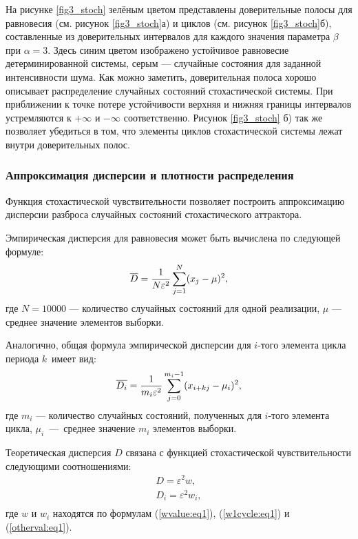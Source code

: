 \documentclass[a4paper, 14pt]{extreport}
\numberwithin{equation}{section}
\numberwithin{figure}{section}
\numberwithin{table}{section}
\begin{document}
				На рисунке \ref{fig3_stoch} зелёным цветом представлены доверительные полосы для равновесия (см. рисунок \ref{fig3_stoch}а) и циклов (см. рисунок \ref{fig3_stoch}б), составленные из доверительных интервалов для каждого значения параметра $ \beta $ при $ \alpha = 3 $. Здесь синим цветом изображено устойчивое равновесие детерминированной системы, серым --- случайные состояния для заданной интенсивности шума. Как можно заметить, доверительная полоса хорошо описывает распределение случайных состояний стохастической системы. При приближении к точке потере устойчивости верхняя и нижняя границы интервалов устремляются к $ +\infty $ и $ -\infty $ соответственно. Рисунок \ref{fig3_stoch} б) так же позволяет убедиться в том, что элементы циклов стохастической системы лежат внутри доверительных полос.

			\subsubsection{Аппроксимация дисперсии и плотности распределения}
            \label{approx_disp_density}
				Функция стохастической чувствительности позволяет построить аппроксимацию дисперсии разброса случайных состояний стохастического аттрактора. %

                Эмпирическая дисперсия для равновесия может быть вычислена по следующей формуле:
				\begin{equation}
					\overline{D} = \frac{1}{N \varepsilon^{2}} \sum\limits_{j=1}^N (x_{j} - \mu)^2, \\[1mm]
				\end{equation}
				где $ N = 10000 $ --- количество случайных состояний для одной реализации, $ \mu $ --- среднее значение элементов выборки. %

                Аналогично, общая формула эмпирической дисперсии для $i$-того элемента цикла периода $ k $~имеет вид:
				\begin{equation}
					\overline{D_{i}} = \frac{1}{m_{i} \varepsilon^{2}} \sum\limits_{j=0}^{m_{i}-1} (x_{i+kj} - \mu_{i})^2, \\[1mm]
				\end{equation}
				где $ m_{i} $ --- количество случайных состояний, полученных для $i$-того элемента цикла, $ \mu_{i} $~---~среднее значение $ m_{i} $ элементов выборки. %

                Теоретическая дисперсия $ D $ связана с функцией стохастической чувствительности следующими соотношениями:
                \begin{equation}
                	\begin{array}{l}
                		D = \varepsilon^2 w,\\
                        D_{i} = \varepsilon^2 w_{i}, \\[1mm]
                	\end{array}
				\end{equation}
                где $ w $ и $ w_{i} $ находятся по формулам (\ref{wvalue:eq1}), (\ref{w1cycle:eq1}) и (\ref{otherval:eq1}). %
\end{document}
